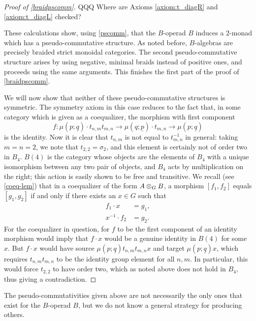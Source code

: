 \begin{proof}[Proof of \cref{braidpscomm}]
QQQ Where are Axioms \ref{axiom:t_diagR} and \ref{axiom:t_diagL} checked?

These calculations show, using \cref{pscomm}, that the $B$-operad $B$ induces a $2$-monad which has a pseudo-commutative structure. As noted before, $B$-algebras are precisely braided strict monoidal categories. The second pseudo-commutative structure arises by using negative, minimal braids instead of positive ones, and proceeds using the same arguments. This finishes the first part of the proof of \cref{braidpscomm}.

We will now show that neither of these pseudo-commutative structures is symmetric. The symmetry axiom in this case reduces to the fact that, in some category which is given as a coequalizer, the morphism with first component
  \[
    f\colon \mu\left(p; \underline{q}\right) \cdot t_{n,m}t_{m,n} \rightarrow \mu\left(q; \underline{p}\right) \cdot t_{m,n} \rightarrow \mu\left(p; \underline{q}\right)
  \]
is the identity. Now it is clear that $t_{n,m}$ is not equal to $t_{m,n}^{-1}$ in general: taking $m=n=2$, we note that $t_{2,2} = \sigma_{2}$, and this element is certainly not of order two in $B_{4}$. $B(4)$ is the category whose objects are the elements of $B_{4}$ with a unique isomorphism between any two pair of objects, and $B_{4}$ acts by multiplication on the right; this action is easily shown to be free and transitive. We recall (see \cref{coeq-lem}) that in a coequalizer of the form $\coeqb{A}{B}{G}$, a morphism $[f_{1}, f_{2}]$ equals $[g_{1}, g_{2}]$ if and only if there exists an $x \in G$ such that
  \begin{align*}
    f_{1} \cdot x &= g_{1}, \\
    x^{-1} \cdot f_{2} &= g_{2}.
  \end{align*}
For the coequalizer in question, for $f$ to be the first component of an identity morphism would imply that $f \cdot x$ would be a genuine identity in $B(4)$ for some $x$. But $f \cdot x$ would have source $\mu\left(p; \underline{q}\right) t_{n,m}t_{m,n}x$ and target $\mu\left(p; \underline{q}\right)x$, which requires $t_{n,m}t_{m,n}$ to be the identity group element for all $n,m$. In particular, this would force $t_{2,2}$ to have order two, which as noted above does not hold in $B_{4}$, thus giving a contradiction.
\end{proof}

\begin{rem}
The pseudo-commutativities given above are not necessarily the only ones that exist for the $B$-operad $B$, but we do not know a general strategy for producing others.
\end{rem}

